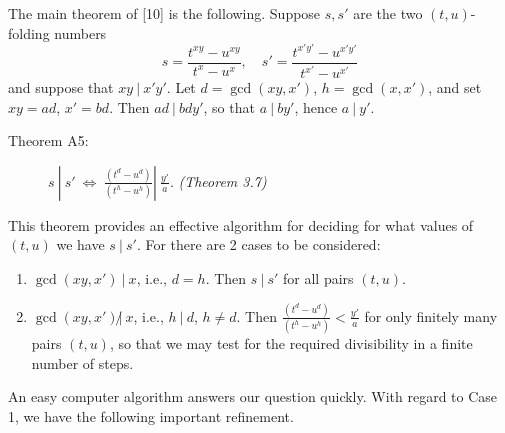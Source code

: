 The main theorem of [10] is the following. Suppose $s,s'$ are the two $(t,u)$-folding numbers
\begin{equation}
s = \frac{t^{xy}-u^{xy}}{t^{x}-u^{x}}, \quad s' = \frac{t^{x'y'}-u^{x'y'}}{t^{x'}-u^{x'}}  \tag{A4}
\end{equation}
and suppose that $xy\ |\ x' y'$. Let $d = \gcd (xy, x')$, $h = \gcd (x,x')$, and set $xy = ad$, $x' = bd$. Then $ad\ |\ bdy'$, so that $a\ |\ by'$, hence $a\ |\ y'$.

\begin{description}

  \item[Theorem A5:] $s\ \left|\ s'\ \Longleftrightarrow\ \frac{(t^{d}-u^{d})}{(t^{h}-u^{h})} \right|\ \frac{y'}{a}$. \emph{(Theorem 3.7)}

\end{description}

This theorem provides an effective algorithm for deciding for what values of $(t,u)$ we have $s\ |\ s'$. For there are 2 cases to be considered:
\begin{enumerate}[\hspace{1cm}(1)]
  \item $\gcd (xy, x')\ |\ x$, i.e., $d = h$. Then $s\ |\ s'$ for all pairs $(t,u)$.
  \item $\gcd (xy, x') \not|\ x$, i.e., $h\ |\ d$, $h \neq d$. Then $\frac{(t^{d}-u^{d})}{(t^{h}-u^{h})} < \frac{y'}{a}$ for only finitely many pairs $(t,u)$, so that we may test for the required divisibility in a finite number of steps.
\end{enumerate}

An easy computer algorithm answers our question quickly. With regard to Case 1, we have the following important refinement.

